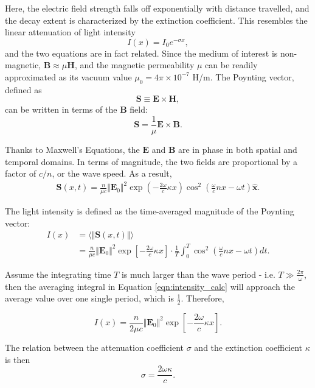 Here, the electric field strength falls off exponentially with distance travelled, and the decay extent is characterized by the extinction coefficient. This resembles the linear
attenuation of light intensity
\begin{equation}
    I(x) = I_0 e^{-\sigma x},
\end{equation}
and the two equations are in fact related. Since the medium of interest is non-magnetic, $\mathbf{B} \approx \mu\mathbf{H}$, and the magnetic permeability $\mu$ can be readily approximated
as its vacuum value $\mu_0 = 4\pi \times 10^{-7}$ H/m. The Poynting vector, defined as
\begin{equation}
    \mathbf{S} \equiv \mathbf{E} \times \mathbf{H},
\end{equation}
can be written in terms of the $\mathbf{B}$ field:
\begin{equation}
    \mathbf{S} = \frac{1}{\mu} \mathbf{E} \times \mathbf{B}.
\end{equation}

Thanks to Maxwell's Equations, the $\mathbf{E}$ and $\mathbf{B}$ are in phase in both spatial and temporal domains. In terms of magnitude, the two fields are proportional by a factor of
$c/n$, or the wave speed. As a result,
\begin{align}
    \mathbf{S}(x,t) = \frac{n}{\mu c} \Vert \mathbf{E}_0 \Vert^2 \exp \left(-\frac{2\omega}{c}\kappa x \right) \cos^2\left(\frac{\omega}{c}nx - \omega t \right) \mathbf{\hat{x}}.
\end{align}

The light intensity is defined as the time-averaged magnitude of the Poynting vector:
\begin{align}
    I(x) &= \langle \Vert \mathbf{S}(x,t) \Vert \rangle \\
    &= \frac{n}{\mu c} \Vert \mathbf{E}_0 \Vert^2 \exp \left[-\frac{2\omega}{c}\kappa x \right] \cdot \frac{1}{T} \int_{0}^{T} \cos^2\left(\frac{\omega}{c}nx - \omega t \right) dt.
    \label{eqn:intensity_calc}
\end{align}

Assume the integrating time $T$ is much larger than the wave period - i.e. $\displaystyle T \gg \frac{2\pi}{\omega}$, then the averaging integral in Equation \ref{eqn:intensity_calc} will
approach the average value over one single period, which is $\displaystyle \frac{1}{2}$. Therefore,

\begin{equation}
    I(x) = \frac{n}{2\mu c} \Vert \mathbf{E}_0 \Vert^2 \exp \left[-\frac{2\omega}{c}\kappa x \right].
\end{equation}

The relation between the attenuation coefficient $\sigma$ and the extinction coefficient $\kappa$ is then
\begin{equation}
    \boxed{ \sigma = \frac{2\omega \kappa}{c} }.
\end{equation}